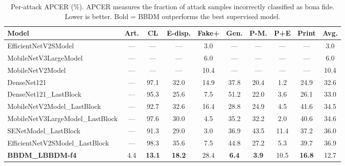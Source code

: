 \begin{table}[t]
\centering
\small
\caption{Per-attack APCER (\%). APCER measures the fraction of attack samples incorrectly classified as bona fide. Lower is better. Bold = BBDM outperforms the best supervised model.}
\label{tab:loo_apcer}
\begin{tabular}{l|ccccccccc}
\toprule
Model & Art. & CL & E-disp. & Fake+ & Gen. & P-M. & P+E & Print & \textbf{Avg.} \\
\midrule
EfficientNetV2SModel & — & — & — & 3.0 & — & — & — & — & 3.0 \\
MobileNetV3LargeModel & — & — & — & 6.0 & — & — & — & — & 6.0 \\
MobileNetV2Model & — & — & — & 10.4 & — & — & — & — & 10.4 \\
DenseNet121 & — & 97.1 & 32.0 & 14.9 & 37.8 & 20.4 & 1.2 & 24.9 & 32.6 \\
DenseNet121_LastBlock & — & 95.3 & 25.6 & 7.5 & 51.2 & 22.0 & 3.6 & 26.1 & 33.0 \\
MobileNetV2Model_LastBlock & — & 92.7 & 32.6 & 16.4 & 28.8 & 24.9 & 4.5 & 41.6 & 34.5 \\
MobileNetV3LargeModel_LastBlock & — & 97.6 & 30.0 & 4.5 & 35.2 & 32.2 & 2.0 & 40.6 & 34.6 \\
SENetModel_LastBlock & — & 91.3 & 29.0 & 3.0 & 36.9 & 43.5 & 11.4 & 37.2 & 36.0 \\
EfficientNetV2SModel_LastBlock & — & 98.3 & 35.6 & 7.5 & 44.8 & 27.2 & 5.3 & 39.7 & 36.9 \\
\midrule
\textbf{BBDM_LBBDM-f4} & 4.4 & \textbf{13.1} & \textbf{18.2} & 28.4 & \textbf{6.4} & \textbf{3.9} & 10.5 & \textbf{16.8} & 12.7 \\
\bottomrule
\end{tabular}
\end{table}